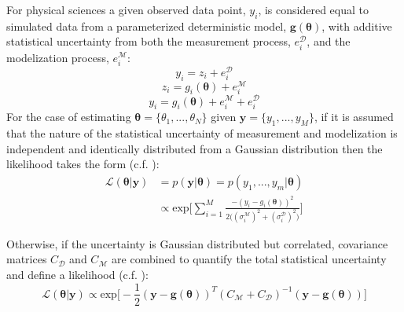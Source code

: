 For physical sciences a given observed data point, $y_i$, is considered equal to simulated data from a parameterized deterministic model, $\bm{g}(\bm{\theta})$, with additive statistical uncertainty from both the measurement process, $e^{\mathcal{D}}_i$, and the modelization process, $e^{\mathcal{M}}_i$:
\begin{equation}
y_i = z_i + e^{\mathcal{D}}_i
\end{equation}
\begin{equation}
z_i = g_i(\bm{\theta}) + e^{\mathcal{M}}_i
\end{equation}
\begin{equation}
y_i = g_i(\bm{\theta}) + e^{\mathcal{M}}_i + e^{\mathcal{D}}_i
\end{equation}
For the case of estimating $\bm{\theta} = \{\theta_1,...,\theta_N\}$ given $\bm{y} = \{y_1,...,y_M\}$, if it is assumed that the nature of the statistical uncertainty of measurement and modelization is independent and identically distributed from a Gaussian distribution then the likelihood takes the form (c.f. \citet[p.91-92]{gregory2005bayesian}): 
\begin{equation}
\begin{split}
\mathcal{L}(\bm{\theta}|\bm{y}) &= p(\bm{y}|\bm{\theta}) = p(y_1,...,y_m|\bm{\theta})\\
&\propto  \text{exp}\bigg[\sum_{i = 1}^{M}\frac{-(y_i-g_i({\bm{\theta}}))^2}{2\big((\sigma^{\mathcal{M}}_i)^2+(\sigma^{\mathcal{D}}_i)^2\big)}\bigg]
\end{split}
\label{likelihood-1}
\end{equation}

Otherwise, if the uncertainty is Gaussian distributed but correlated, covariance matrices $C_{\mathcal{D}}$ and $C_{\mathcal{M}}$ are combined to quantify the total statistical uncertainty and define a likelihood (c.f. \citet[p.35-36]{Tarantola2005}):
\begin{equation}
\mathcal{L}(\bm{\theta}|\bm{y}) \propto \text{exp}\bigg[-\frac{1}{2}(\bm{y}-\bm{g}(\bm{\theta}))^T(C_{\mathcal{M}}+C_{\mathcal{D}})^{-1}(\bm{y}-\bm{g}(\bm{\theta}))\bigg]
\label{likelihood-2}
\end{equation}

